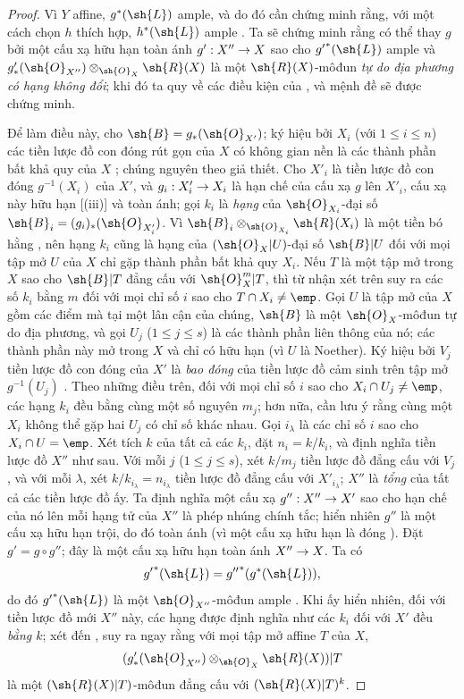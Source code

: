 \documentclass[oneside,10pt]{amsart}
\makeatletter
\renewcommand{\leq}{\leqslant}
\newcommand{\ega@arrow}[2]{\mathchoice{#1}{#2}{#2}{#2}}
\renewcommand{\to}{\ega@arrow{\longrightarrow}{\rightarrow}}
\newcommand{\oldpage}[2][]{\marginnote{\normalfont\footnotesize\textbf{#1}~|~#2}\ignorespaces}
\makeatother
\begin{document}
\begin{proof}
Vì $Y$ affine, $g^*(\sh{L})$ ample, và do đó cần chứng minh rằng, với một cách chọn $h$ thích hợp, $h^*(\sh{L})$ ample .
Ta sẽ chứng minh rằng có thể thay $g$ bởi một cấu xạ hữu hạn toàn ánh $g':X''\to X$ sao cho ${g'}^*(\sh{L})$ ample và $g'_*(\sh{O}_{X''})\otimes_{\sh{O}_X}\sh{R}(X)$ là một $\sh{R}(X)$-môđun \emph{tự do địa phương có hạng không đổi};
khi đó ta quy về các điều kiện của , và mệnh đề sẽ được chứng minh.

Để làm điều này, cho $\sh{B}=g_*(\sh{O}_{X'})$;
ký hiệu bởi $X_i$ (với $1\leq i\leq n$) các tiền lược đồ con đóng rút gọn của $X$ có không gian nền là các thành phần bất khả quy của $X$ ;
chúng nguyên theo giả thiết.
Cho $X'_i$ là tiền lược đồ con đóng
\oldpage[II]{135}
$g^{-1}(X_i)$ của $X'$, và $g_i:X'_i\to X_i$ là hạn chế của cấu xạ $g$ lên $X'_i$, cấu xạ này hữu hạn [(iii)] và toàn ánh;
gọi $k_i$ là \emph{hạng} của $\sh{O}_{X_i}$-đại số $\sh{B}_i=(g_i)_*(\sh{O}_{X'_i})$.
Vì $\sh{B}_i\otimes_{\sh{O}_{X_i}}\sh{R}(X_i)$ là một tiền bó hằng , nên hạng $k_i$ cũng là hạng của $(\sh{O}_X|U)$-đại số $\sh{B}|U$ đối với mọi tập mở $U$ của $X$ chỉ gặp thành phần bất khả quy $X_i$.
Nếu $T$ là một tập mở trong $X$ sao cho $\sh{B}|T$ đẳng cấu với $\sh{O}_X^m|T$, thì từ nhận xét trên suy ra các số $k_i$ bằng $m$ đối với mọi chỉ số $i$ sao cho $T\cap X_i\neq\emp$.
Gọi $U$ là tập mở của $X$ gồm các điểm mà tại một lân cận của chúng, $\sh{B}$ là một $\sh{O}_X$-môđun tự do địa phương, và gọi $U_j$ ($1\leq j\leq s$) là các thành phần liên thông của nó; các thành phần này mở trong $X$ và chỉ có hữu hạn (vì $U$ là Noether).
Ký hiệu bởi $V_j$ tiền lược đồ con đóng của $X'$ là \emph{bao đóng} của tiền lược đồ cảm sinh trên tập mở $g^{-1}(U_j)$ .
Theo những điều trên, đối với mọi chỉ số $i$ sao cho $X_i\cap U_j\neq\emp$, các hạng $k_i$ đều bằng cùng một số nguyên $m_j$;
hơn nữa, cần lưu ý rằng cùng một $X_i$ không thể gặp hai $U_j$ có chỉ số khác nhau.
Gọi $i_\lambda$ là các chỉ số $i$ sao cho $X_i\cap U=\emp$.
Xét tích $k$ của tất cả các $k_i$, đặt $n_i=k/k_i$, và định nghĩa tiền lược đồ $X''$ như sau.
Với mỗi $j$ ($1\leq j\leq s$), xét $k/m_j$ tiền lược đồ đẳng cấu với $V_j$, và với mỗi $\lambda$, xét $k/k_{i_\lambda}=n_{i_\lambda}$ tiền lược đồ đẳng cấu với $X'_{i_\lambda}$;
$X''$ là \emph{tổng} của tất cả các tiền lược đồ ấy.
Ta định nghĩa một cấu xạ $g'':X''\to X'$ sao cho hạn chế của nó lên mỗi hạng tử của $X''$ là phép nhúng chính tắc;
hiển nhiên $g''$ là một cấu xạ hữu hạn trội, do đó toàn ánh (vì một cấu xạ hữu hạn là đóng ).
Đặt $g'=g\circ g''$; đây là một cấu xạ hữu hạn toàn ánh $X''\to X$.
Ta có
\[
  {g'}^*(\sh{L})={g''}^*(g^*(\sh{L})),
\]
do đó ${g'}^*(\sh{L})$ là một $\sh{O}_{X''}$-môđun ample .
Khi ấy hiển nhiên, đối với tiền lược đồ mới $X''$ này, các hạng được định nghĩa như các $k_i$ đối với $X'$ đều \emph{bằng $k$};
xét đến , suy ra ngay rằng với mọi tập mở affine $T$ của $X$,
\[
  (g'_*(\sh{O}_{X''})\otimes_{\sh{O}_X}\sh{R}(X))|T
\]
là một $(\sh{R}(X)|T)$-môđun đẳng cấu với $(\sh{R}(X)|T)^k$.
\end{proof}
\end{document}
